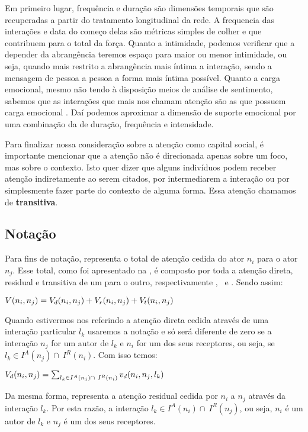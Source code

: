 Em primeiro lugar, frequência e duração são dimensões temporais que são
recuperadas a partir do tratamento longitudinal da rede. A frequencia das
interações e data do começo delas são métricas simples de colher e que contribuem
para o total da força. Quanto a intimidade, podemos verificar que a
depender da abrangência teremos espaço para maior ou menor intimidade, ou seja, quando mais
restrito a abrangência mais íntima a interação, sendo a mensagem de pessoa a
pessoa a forma mais íntima possível. Quanto a carga emocional, mesmo não tendo à
disposição meios de análise de sentimento, sabemos que as interações que mais nos
chamam atenção são as que possuem carga emocional \citep{Davenport2001}. Daí
podemos aproximar a dimensão de suporte emocional por uma combinação da de
duração, frequência e intensidade.

Para finalizar nossa consideração sobre a atenção como capital social, é
importante mencionar que a atenção não é direcionada apenas sobre um foco, mas
sobre o contexto. Isto quer dizer que alguns indivíduos podem receber atenção
indiretamente ao serem citados, por intermediarem a interação ou por
simplesmente fazer parte do contexto de alguma forma. Essa atenção chamamos de
\textbf{transitiva}.

\subsection{Notação}

Para fins de notação,  representa o total de atenção cedida do
ator $n_i$ para o ator $n_j$. Esse total, como foi apresentado na
, é composto por toda a atenção direta, residual e
transitiva de um para o outro, respectivamente \Vd, \Vr\ e \Vtr. Sendo
assim:

\begin{Def}
$V(n_i, n_j) = V_d(n_i, n_j) + V_r(n_i, n_j) + V_t(n_i, n_j)$
\end{Def}

Quando estivermos nos referindo a atenção direta cedida através de uma interação
particular $l_k$ usaremos a notação  e só será diferente de zero se
a interação $n_j$ for um autor de $l_k$ e $n_i$ for um dos seus receptores, ou
seja, se $l_k \in I^A(n_j)\cap~I^R(n_i)$. Com isso temos:

\begin{Def}
$V_d(n_i, n_j) = \sum_{l_k \in I^A(n_j)\cap~I^R(n_i)}v_d(n_i, n_j, l_k)$
\end{Def}

Da mesma forma,  representa a atenção residual cedida por $n_i$ a
$n_j$ através da interação $l_k$. Por esta razão, a interação $l_k \in I^A(n_i)
\cap~I^R(n_j)$, ou seja, $n_i$ é um autor de $l_k$ e $n_j$ é um dos seus
receptores.

